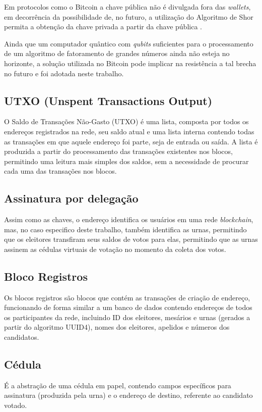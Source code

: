 Em protocolos como o Bitcoin a chave pública não é divulgada fora das \textit{wallets}, em decorrência da possibilidade de, no futuro, a utilização do Algoritmo de Shor permita a obtenção da chave privada a partir da chave pública \cite{Mavroeidis2018}. 

Ainda que um computador quântico com \textit{\glspl{qubit}} suficientes para o processamento de um algoritmo de fatoramento de grandes números ainda não esteja no horizonte, a solução utilizada no Bitcoin pode implicar na resistência a tal brecha no futuro e foi adotada neste trabalho. 

\subsection{UTXO (Unspent Transactions Output)}

O Saldo de Transações Não-Gasto (UTXO) é uma lista, composta por todos os endereços registrados na rede, seu saldo atual e uma lista interna contendo todas as transações em que aquele endereço foi parte, seja de entrada ou saída. A lista é produzida a partir do processamento das transações existentes nos blocos, permitindo uma leitura mais simples dos saldos, sem a necessidade de procurar cada uma das transações nos blocos.

\subsection{Assinatura por delegação}

Assim como as chaves, o endereço identifica os usuários em uma rede \textit{blockchain}, mas, no caso especifico deste trabalho, também identifica as urnas, permitindo que os eleitores transfiram seus saldos de votos para elas, permitindo que as urnas assinem as cédulas virtuais de votação no momento da coleta dos votos. 

\subsection{Bloco Registros}

Os blocos registros são blocos que contém as transações de criação de endereço, funcionando de forma similar a um banco de dados contendo endereços de todos os participantes da rede, incluindo ID dos eleitores, mesários e urnas (gerados a partir do algoritmo UUID4), nomes dos eleitores, apelidos e números dos candidatos. 

\subsection{Cédula}
É a abstração de uma cédula em papel, contendo campos específicos para assinatura (produzida pela urna) e o endereço de destino, referente ao candidato votado.

